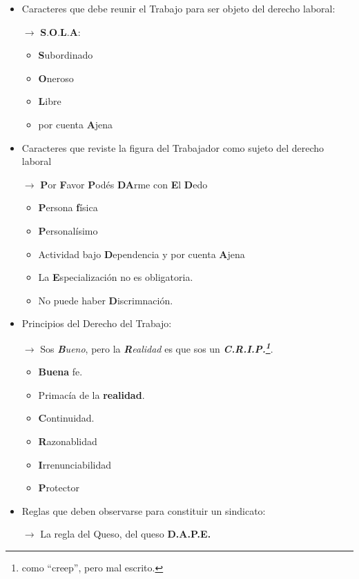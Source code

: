 \documentclass[spanish,12pt,a4paper,titlepage]{report}
\begin{document}
\begin{itemize}
\item Caracteres que debe reunir el Trabajo para ser objeto del derecho laboral:

$\rightarrow$ \textbf{S}.\textbf{O}.\textbf{L}.\textbf{A}:
\begin{itemize}
\item \textbf{S}ubordinado
\item \textbf{O}neroso
\item \textbf{L}ibre
\item  por cuenta \textbf{A}jena
\end{itemize}


\item Caracteres que reviste la figura del Trabajador como sujeto del derecho laboral

$\rightarrow$ \textbf{P}or \textbf{F}avor \textbf{P}odés \textbf{DA}rme con \textbf{E}l \textbf{D}edo
\begin{itemize}
\item \textbf{P}ersona \textbf{f}ísica
\item \textbf{P}ersonalísimo
\item Actividad bajo \textbf{D}ependencia y por cuenta \textbf{A}jena
\item La \textbf{E}specialización no es obligatoria.
\item No puede haber \textbf{D}iscrimnación.
\end{itemize}

\item Principios del Derecho del Trabajo:

$\rightarrow$ Sos \textit{\textbf{B}ueno}, pero la \textit{\textbf{R}ealidad} es que sos un \textit{\textbf{C.R.I.P.\footnote{como ``creep'', pero mal escrito.}}}.

\begin{itemize}
\item \textbf{Buena} fe.
\item Primacía de la \textbf{realidad}.
\item \textbf{C}ontinuidad.
\item \textbf{R}azonablidad
\item \textbf{I}rrenunciabilidad
\item \textbf{P}rotector
\end{itemize}

\item Reglas que deben observarse para constituir un sindicato:

$\rightarrow$ La regla del Queso, del queso \textbf{D.A.P.E.}


\end{itemize}
\end{document}
